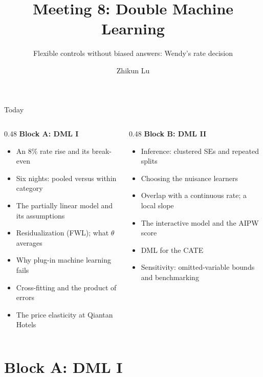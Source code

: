 \documentclass[aspectratio=169, 11pt, handout]{beamer}
\title[Meeting 8]{Meeting 8: Double Machine Learning}
\subtitle{Flexible controls without biased answers: Wendy's rate decision}
\author{Zhikun Lu}
\date{}
\begin{document}
\begin{frame}
\titlepage
\end{frame}

\begin{frame}{Today}

\begin{columns}[T]
\begin{column}{0.48\textwidth}
\textbf{Block A: DML I}
\begin{itemize}
  \item An 8\% rate rise and its break-even
  \item Six nights: pooled versus within category
  \item The partially linear model and its assumptions
  \item Residualization (FWL); what $\theta$ averages
  \item Why plug-in machine learning fails
  \item Cross-fitting and the product of errors
  \item The price elasticity at Qiantan Hotels
\end{itemize}
\end{column}
\begin{column}{0.48\textwidth}
\textbf{Block B: DML II}
\begin{itemize}
  \item Inference: clustered SEs and repeated splits
  \item Choosing the nuisance learners
  \item Overlap with a continuous rate; a local slope
  \item The interactive model and the AIPW score
  \item DML for the CATE
  \item Sensitivity: omitted-variable bounds and benchmarking
\end{itemize}
\end{column}
\end{columns}
\end{frame}

\section{Block A: DML I}
\end{document}
